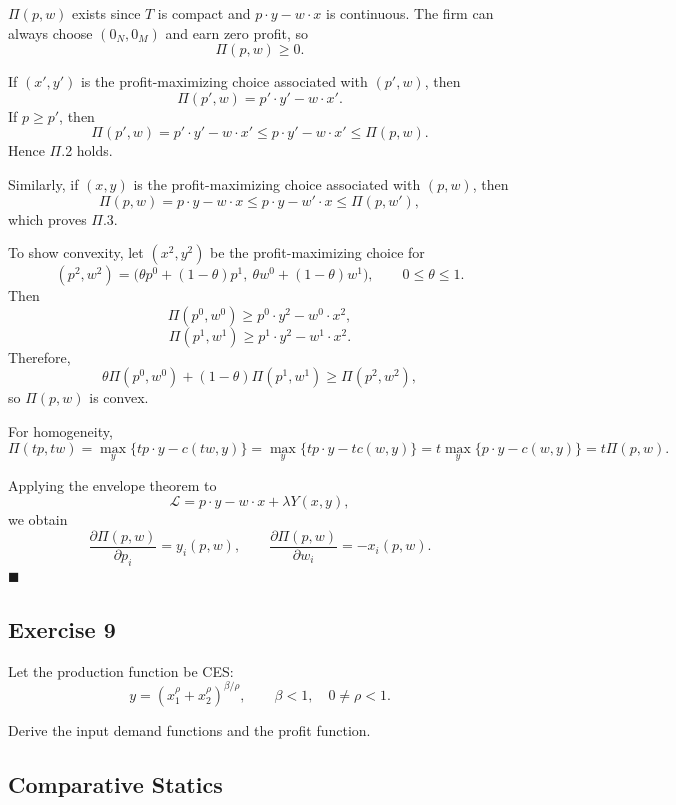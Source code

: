 $\Pi(p,w)$ exists since $T$ is compact and $p\cdot y - w\cdot x$ is continuous.
The firm can always choose $(0_N,0_M)$ and earn zero profit, so
\[
\Pi(p,w)\ge 0.
\]

\medskip

If $(x',y')$ is the profit-maximizing choice associated with $(p',w)$, then
\[
\Pi(p',w)=p'\cdot y' - w\cdot x'.
\]
If $p\ge p'$, then
\[
\Pi(p',w)=p'\cdot y' - w\cdot x'
\le p\cdot y' - w\cdot x'
\le \Pi(p,w).
\]
Hence $\Pi$.2 holds.

\medskip

Similarly, if $(x,y)$ is the profit-maximizing choice associated with $(p,w)$, then
\[
\Pi(p,w)=p\cdot y - w\cdot x
\le p\cdot y - w'\cdot x
\le \Pi(p,w'),
\]
which proves $\Pi$.3.

\medskip

To show convexity, let $(x^2,y^2)$ be the profit-maximizing choice for
\[
(p^2,w^2)=\bigl(\theta p^0+(1-\theta)p^1,\ \theta w^0+(1-\theta)w^1\bigr),
\qquad 0\le \theta \le 1.
\]
Then
\[
\Pi(p^0,w^0)\ge p^0\cdot y^2 - w^0\cdot x^2,
\]
\[
\Pi(p^1,w^1)\ge p^1\cdot y^2 - w^1\cdot x^2.
\]
Therefore,
\[
\theta \Pi(p^0,w^0)+(1-\theta)\Pi(p^1,w^1)
\ge
\Pi(p^2,w^2),
\]
so $\Pi(p,w)$ is convex.

\medskip

For homogeneity,
\[
\Pi(tp,tw)
=
\max_y \{tp\cdot y - c(tw,y)\}
=
\max_y \{tp\cdot y - t c(w,y)\}
=
t\max_y \{p\cdot y - c(w,y)\}
=
t\Pi(p,w).
\]

\medskip

Applying the envelope theorem to
\[
\mathcal{L}=p\cdot y - w\cdot x + \lambda Y(x,y),
\]
we obtain
\[
\frac{\partial \Pi(p,w)}{\partial p_i}=y_i(p,w),
\qquad
\frac{\partial \Pi(p,w)}{\partial w_i}=-x_i(p,w).
\]
\hfill $\blacksquare$

\begin{tcolorbox}

\subsection*{Exercise 9}

Let the production function be CES:
\[
y = \left(x_1^\rho + x_2^\rho\right)^{\beta/\rho},
\qquad \beta<1,\quad 0\ne \rho<1.
\]

Derive the input demand functions and the profit function.


\end{tcolorbox}



\subsection*{Comparative Statics}

